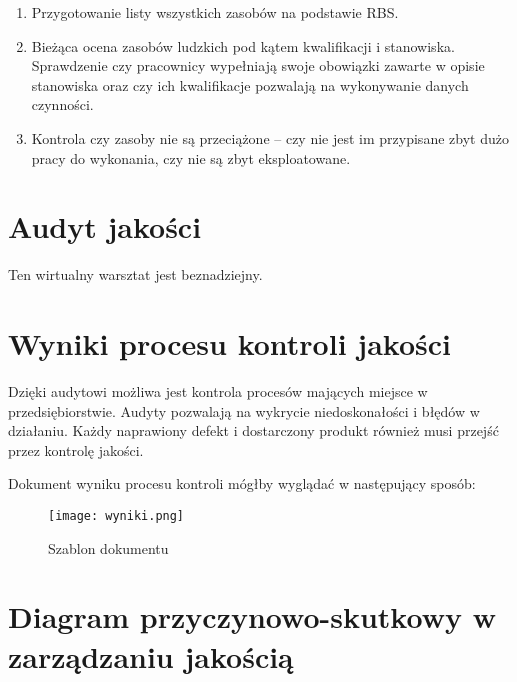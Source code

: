 \begin{enumerate}
\item	Przygotowanie listy wszystkich zasobów na podstawie RBS.
\item	Bieżąca ocena zasobów ludzkich pod kątem kwalifikacji i stanowiska.  Sprawdzenie czy pracownicy wypełniają swoje obowiązki zawarte w opisie stanowiska oraz czy ich kwalifikacje pozwalają na wykonywanie danych czynności.
\item	Kontrola czy zasoby nie są przeciążone – czy nie jest im przypisane zbyt dużo pracy do wykonania, czy nie są zbyt eksploatowane.
\end{enumerate}


\section{Audyt jakości}

Ten wirtualny warsztat jest beznadziejny.


\section{Wyniki procesu kontroli jakości}
Dzięki audytowi możliwa jest kontrola procesów mających miejsce w przedsiębiorstwie. Audyty pozwalają na wykrycie niedoskonałości i błędów w działaniu. Każdy naprawiony defekt i dostarczony produkt również musi przejść przez kontrolę jakości. 

Dokument wyniku procesu kontroli mógłby wyglądać w następujący sposób:

\begin{figure}[h]
\begin{center}
\texttt{[image: wyniki.png]}
\caption[Szablon dokumentu]{Szablon dokumentu}
\label{rysunekProces}
\end{center}
\end{figure}


\section{Diagram przyczynowo-skutkowy w zarządzaniu jakością}


